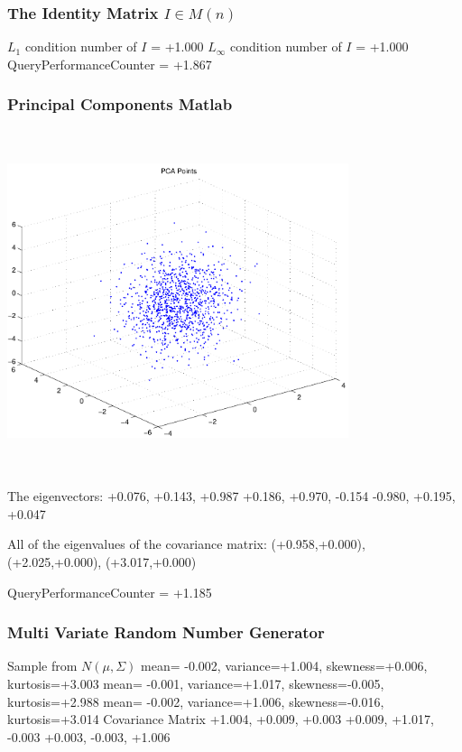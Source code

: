 \documentclass[9pt]{article}
\theoremstyle{plain}
\theoremstyle{definition}
\theoremstyle{remark}
\numberwithin{equation}{section}
\begin{document}
\subsubsection{The Identity Matrix $I \in M(n)$}
$L_1$ condition number of $I$ = +1.000
$L_\infty$ condition number of $I$ = +1.000
QueryPerformanceCounter  =  +1.867
\subsubsection{Principal Components Matlab }
\includegraphics[width=10.0cm,height=10.0cm]{PCAPoints.pdf}

The eigenvectors:
+0.076, +0.143, +0.987
+0.186, +0.970, -0.154
-0.980, +0.195, +0.047

All of the eigenvalues of the covariance matrix:
(+0.958,+0.000), (+2.025,+0.000), (+3.017,+0.000)

QueryPerformanceCounter  =  +1.185
\subsubsection{Multi Variate Random Number Generator }
Sample from $N(\mu,\Sigma)$
mean= -0.002, variance=+1.004, skewness=+0.006, kurtosis=+3.003
mean= -0.001, variance=+1.017, skewness=-0.005, kurtosis=+2.988
mean= -0.002, variance=+1.006, skewness=-0.016, kurtosis=+3.014
Covariance Matrix 
+1.004, +0.009, +0.003
+0.009, +1.017, -0.003
+0.003, -0.003, +1.006
\end{document}

